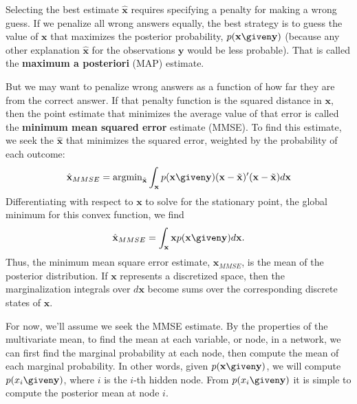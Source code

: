 Selecting the best estimate $\mathbf{\hat{x}}$ requires specifying a
penalty for making a wrong guess. If we penalize all wrong answers
equally, the best strategy is to guess the value of  $\mathbf{x}$ that maximizes
the posterior probability, $p(\mathbf{x} \given \mathbf{y})$ (because any other
explanation $\mathbf{\hat{x}}$ for the observations $\mathbf{y}$  would be
less probable).  That is called the {\bf maximum a posteriori} (MAP) estimate.

But we may want to penalize wrong answers as a function of how far
they are from the correct answer.  If that penalty function is
the squared distance in $\mathbf{x}$, then the point estimate that
minimizes the average value of that error is called the {\bf minimum mean squared error}
estimate (MMSE).
To find this estimate, we seek 
the $\hat{\mathbf{x}}$ that minimizes the squared error, weighted by the probability of each outcome:
\begin{equation}
\hat{\mathbf{x}}_{MMSE} = \mbox{argmin}_{\tilde{\mathbf{x}}} 
\int_{\mathbf{x}} p(\mathbf{x} \given \mathbf{y}) (\mathbf{x}-\tilde{\mathbf{x}})'
(\mathbf{x}-\tilde{\mathbf{x}}) d\mathbf{x}
\end{equation} 
Differentiating with respect to $\mathbf{x}$ to solve for the stationary
point, the global minimum for this convex function, we find
\begin{equation}
\hat{\mathbf{x}}_{MMSE} = \int_{\mathbf{x}} \mathbf{x} p(\mathbf{x} \given \mathbf{y})  d\mathbf{x}.
\end{equation}
Thus, the minimum mean square error estimate, $\hat{\mathbf{x}}_{MMSE}$,
is the mean of the posterior distribution.  
If $\mathbf{x}$ represents a discretized space, then the
marginalization integrals over $d\mathbf{x}$ become sums over the
corresponding discrete states of $\mathbf{x}$.


For now, we'll assume we seek the MMSE estimate. By the properties of
the multivariate mean, to find the mean at each variable, or node, in
a network, we can first find the marginal probability at each node,
then compute the mean of each marginal probability.  In other words,
given $p(\mathbf{x} \given \mathbf{y})$, we will compute $p(x_i \given \mathbf{y})$,
where $i$ is the $i$-th hidden node.  From $p(x_i \given \mathbf{y})$ it is
simple to compute the posterior mean at node $i$.

